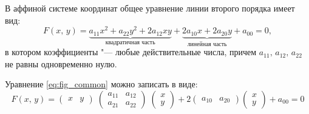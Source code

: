 \begin{definition}
  В аффиной системе координат общее уравнение линии второго порядка имеет вид:  
  \begin{equation}
    \label{eq:fig_common}
    F(x,\, y) = \underbrace{a_{11}x^2 + a_{22}y^2 + 2a_{12}xy}_{\text{квадратичная часть}} + 
  \underbrace{2a_{10}x + 2a_{20}y}_{\text{линейная часть}} + a_{00} = 0,
  \end{equation}
  в котором коэффициенты "--- любые действительные числа, причем $a_{11},\, a_{12}, \, a_{22}$ не равны одновременно нулю.
\end{definition}

Уравнение \ref{eq:fig_common} можно записать в виде:
$$
  F(x, \, y) = \begin{pmatrix} x & y \end{pmatrix} \; \begin{pmatrix}
    a_{11} & a_{12} \\
    a_{21} & a_{22}
  \end{pmatrix} \; \begin{pmatrix} x \\ y \end{pmatrix} + 2 \begin{pmatrix} a_{10} & a_{20} \end{pmatrix} \begin{pmatrix} x \\ y \end{pmatrix} + a_{00} = 0
$$

